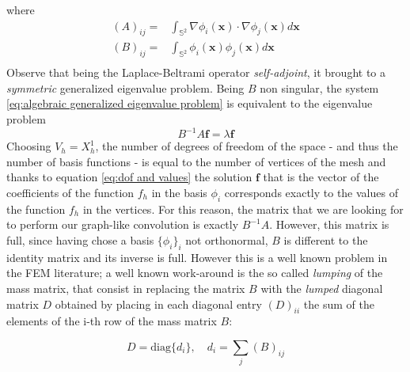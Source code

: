 where 
\begin{align*}
	(A)_{ij} = &\int_{\mathbb S^2}\nabla \phi_i(\mathbf{x})\cdot \nabla \phi_j(\mathbf{x})d\mathbf{x}\\
	(B)_{ij} = &\int_{\mathbb S^2} \phi_i(\mathbf{x}) \phi_j(\mathbf{x})d\mathbf{x}\\
\end{align*}
Observe that being the Laplace-Beltrami operator \textit{self-adjoint}, it brought to a \textit{symmetric} generalized eigenvalue problem. Being $B$ non singular, the system \ref{eq:algebraic generalized eigenvalue problem} is equivalent to the eigenvalue problem
\begin{equation}\label{eq:algebraic  eigenvalue problem}
B^{-1}A\mathbf f = \lambda \mathbf f
\end{equation}
Choosing $V_h = X^1_h$, the number of degrees of freedom of the space - and thus the number of basis functions - is equal to the number of vertices of the mesh and thanks to equation \ref{eq:dof and values} the solution $\mathbf f$ that is the vector of the coefficients of the function $f_h$ in the basis $\phi_i$ corresponds exactly to the values of the function $f_h$ in the vertices. For this reason, the matrix that we are looking for to perform our graph-like convolution is exactly $B^{-1}A$. However, this matrix is full, since having chose a basis $\{\phi_i\}_i$ not orthonormal, $B$ is different to the identity matrix and its inverse is full. However this is a well known problem in the FEM literature; a well known work-around is the so called \textit{lumping} of the mass matrix, that consist in replacing the matrix $B$ with the \textit{lumped} diagonal matrix $D$ obtained by placing in each diagonal entry $(D)_{ii}$ the sum of the elements of the i-th row of the mass matrix $B$:

\begin{equation}\label{eq:lumping}
D = \text{diag}\{d_i\},\quad d_i = \sum_j (B)_{ij}
\end{equation}

